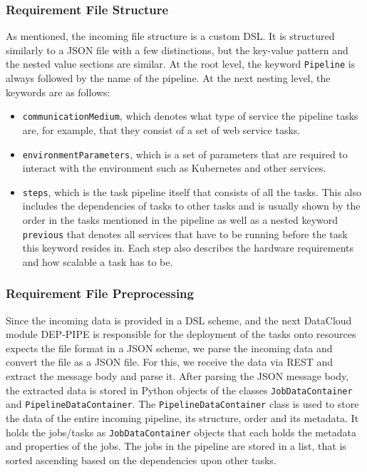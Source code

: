 \documentclass{article}
\begin{document}
            \subsubsection{Requirement File Structure}
            \label{sec:requirement-file-structure-server}

                As mentioned, the incoming file structure is a custom DSL.
                It is structured similarly to a JSON file with a few distinctions, but the key-value pattern and the nested value sections are similar. At the root level, the keyword \texttt{Pipeline} is always followed by the name of the pipeline.
                At the next nesting level, the keywords are as follows: 
                \begin{itemize}
                    \item \texttt{communicationMedium}, which denotes what type of service the pipeline tasks are, for example, that they consist of a set of web service tasks.
                    \item \texttt{environmentParameters}, which is a set of parameters that are required to interact with the environment such as Kubernetes and other services.
                    \item \texttt{steps}, which is the task pipeline itself that consists of all the tasks. This also includes the dependencies of tasks to other tasks and is usually shown by the order in the tasks mentioned in the pipeline as well as a nested keyword \texttt{previous} that denotes all services that have to be running before the task this keyword resides in. Each step also describes the hardware requirements and how scalable a task has to be.
                \end{itemize}
                

            \subsubsection{Requirement File Preprocessing}
            \label{sec:requirement-file-preprocessing-server}

                Since the incoming data is provided in a DSL scheme, and the next DataCloud module DEP-PIPE is responsible for the deployment of the tasks onto resources expects the file format in a JSON scheme, we parse the incoming data and convert the file as a JSON file. For this, we receive the data via REST and extract the message body and parse it.
                After parsing the JSON message body, the extracted data is stored in Python objects of the classes \texttt{JobDataContainer} and \texttt{PipelineDataContainer}. 
                The \texttt{PipelineDataContainer} class is used to store the data of the entire incoming pipeline, its structure, order and its metadata. It holds the jobs/tasks as \texttt{JobDataContainer} objects that each holds the metadata and properties of the jobs.
                The jobs in the pipeline are stored in a list, that is sorted ascending based on the dependencies upon other tasks.
\end{document}
